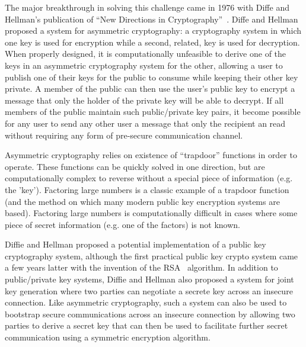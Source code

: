\documentclass{sig-alternate}
\begin{document}
The major breakthrough in solving this challenge came in 1976 with
Diffe and Hellman's publication of ``New Directions in
Cryptography''~\cite{Diffie1976}. Diffe and Hellman proposed a system
for asymmetric cryptography: a cryptography system in which one key is
used for encryption while a second, related, key is used for
decryption. When properly designed, it is computationally unfeasible
to derive one of the keys in an asymmetric cryptography system for the
other, allowing a user to publish one of their keys for the public to
consume while keeping their other key private. A member of the public
can then use the user's public key to encrypt a message that only the
holder of the private key will be able to decrypt. If all members of
the public maintain such public/private key pairs, it become possible
for any user to send any other user a message that only the recipient
an read without requiring any form of pre-secure communication
channel.

Asymmetric cryptography relies on existence of ``trapdoor'' functions
in order to operate. These functions can be quickly solved in one
direction, but are computationally complex to reverse without a
special piece of information (e.g. the 'key'). Factoring large numbers
is a classic example of a trapdoor function (and the method on which
many modern public key encryption systems are based). Factoring large
numbers is computationally difficult in cases where some piece of
secret information (e.g. one of the factors) is not known.

Diffie and Hellman proposed a potential implementation of a public key
cryptography system, although the first practical public key crypto
system came a few years latter with the invention of the
RSA~\cite{Rivest1978} algorithm. In addition to public/private key
systems, Diffie and Hellman also proposed a system for joint key
generation where two parties can negotiate a secrete key across an
insecure connection. Like asymmetric cryptography, such a system can
also be used to bootstrap secure communications across an insecure
connection by allowing two parties to derive a secret key that can
then be used to facilitate further secret communication using a
symmetric encryption algorithm.
\end{document}
